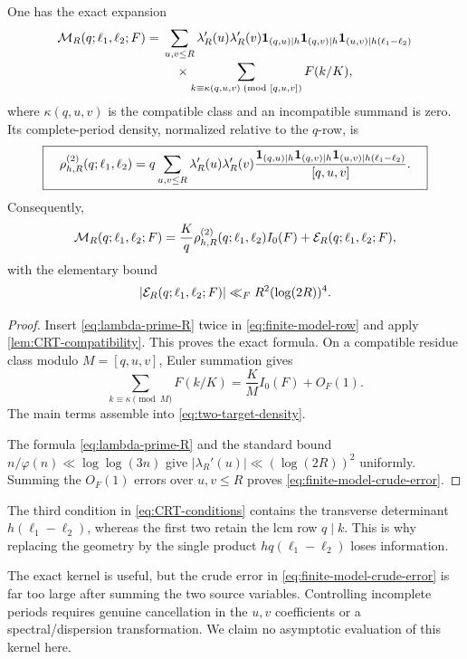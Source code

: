 \begin{theorem}
\label{thm:finite-model-density}
One has the exact expansion
\begin{align}
 \mathcal M_R(q;\ell_1,\ell_2;F)
 ={}&\sum_{u,v\le R}\lambda_R'(u)\lambda_R'(v)
 \mathbf 1_{(q,u)\mid h}\mathbf 1_{(q,v)\mid h}
 \mathbf 1_{(u,v)\mid h(\ell_1-\ell_2)}
 \notag\\[-0.2em]
 &\quad\times
 \sum_{\substack{k\equiv\kappa(q,u,v)\!
  \pmod{[q,u,v]}}}F(k/K),
 \label{eq:finite-model-exact-CRT}
\end{align}
where $\kappa(q,u,v)$ is the compatible class and an incompatible
summand is zero.  Its complete-period density, normalized relative to
the $q$-row, is
\begin{equation}
 \boxed{\quad
 \rho^{(2)}_{h,R}(q;\ell_1,\ell_2)
 =q\sum_{u,v\le R}\lambda_R'(u)\lambda_R'(v)
 \frac{
 \mathbf 1_{(q,u)\mid h}\mathbf 1_{(q,v)\mid h}
 \mathbf 1_{(u,v)\mid h(\ell_1-\ell_2)}}{[q,u,v]}.
 \quad}
 \label{eq:two-target-density}
\end{equation}
Consequently,
\begin{equation}
 \mathcal M_R(q;\ell_1,\ell_2;F)
 =\frac Kq\rho^{(2)}_{h,R}(q;\ell_1,\ell_2)I_0(F)
 +\mathcal E_R(q;\ell_1,\ell_2;F),
 \label{eq:finite-model-main-error}
\end{equation}
with the elementary bound
\begin{equation}
 |\mathcal E_R(q;\ell_1,\ell_2;F)|
 \ll_F R^2(\log(2R))^4.
 \label{eq:finite-model-crude-error}
\end{equation}
\end{theorem}

\begin{proof}
Insert \eqref{eq:lambda-prime-R} twice in
\eqref{eq:finite-model-row} and apply
\cref{lem:CRT-compatibility}.  This proves the exact formula.  On a
compatible residue class modulo $M=[q,u,v]$, Euler summation gives
\[
 \sum_{k\equiv\kappa\pmod M}F(k/K)
 =\frac KM I_0(F)+O_F(1).
\]
The main terms assemble into \eqref{eq:two-target-density}.

The formula \eqref{eq:lambda-prime-R} and the standard bound
$n/\varphi(n)\ll\log\log(3n)$ give
$|\lambda_R'(u)|\ll(\log(2R))^2$ uniformly.  Summing the $O_F(1)$
errors over $u,v\le R$ proves \eqref{eq:finite-model-crude-error}.
\end{proof}

The third condition in \eqref{eq:CRT-conditions} contains the
transverse determinant $h(\ell_1-\ell_2)$, whereas the first two retain
the lcm row $q\mid k$.  This is why replacing the geometry by the single
product $hq(\ell_1-\ell_2)$ loses information.

The exact kernel is useful, but the crude error in
\eqref{eq:finite-model-crude-error} is far too large after summing the
two source variables.  Controlling incomplete periods requires genuine
cancellation in the $u,v$ coefficients or a spectral/dispersion
transformation.  We claim no asymptotic evaluation of this kernel here.
